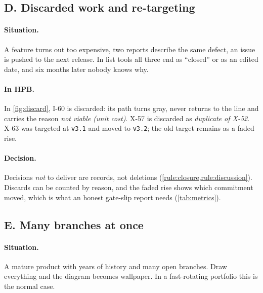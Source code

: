 \subsection{D. Discarded work and re-targeting}
\label{sec:cond-discard}



\paragraph{Situation.}
A feature turns out too expensive, two reports describe the same defect,
an issue is pushed to the next release. In list tools all three end as
``closed'' or as an edited date, and six months later nobody knows why.

\paragraph{In HPB.}
In \cref{fig:discard}, I-60 is discarded: its path turns gray, never
returns to the line and carries the reason \emph{not viable (unit cost)}.
X-57 is discarded as \emph{duplicate of X-52}. X-63 was targeted at
\texttt{v3.1} and moved to \texttt{v3.2}; the old target remains as a
faded rise.

\paragraph{Decision.}
Decisions \emph{not} to deliver are records, not deletions
(\cref{rule:closure,rule:discussion}). Discards can be counted by reason,
and the faded rise shows which commitment moved, which is what an honest
gate-slip report needs (\cref{tab:metrics}).

\subsection{E. Many branches at once}
\label{sec:cond-scale}



\paragraph{Situation.}
A mature product with years of history and many open branches. Draw
everything and the diagram becomes wallpaper. In a fast-rotating
portfolio this is the normal case.

